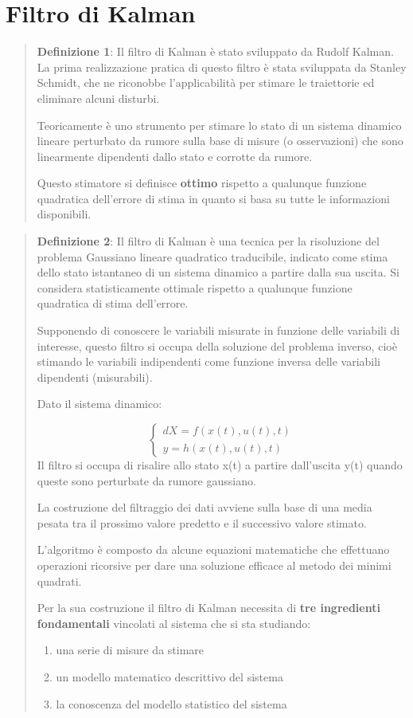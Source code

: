 \section{Filtro di Kalman}
\begin{quotation}
	\textbf{Definizione 1}: Il filtro di Kalman è stato sviluppato da Rudolf Kalman. 
	La prima realizzazione pratica di questo filtro è stata sviluppata da Stanley Schmidt, che ne riconobbe l'applicabilità per stimare le traiettorie ed eliminare alcuni disturbi.
	
	Teoricamente è uno strumento per stimare lo stato di un sistema dinamico lineare perturbato da rumore sulla base di misure (o osservazioni) che sono linearmente dipendenti dallo stato e corrotte da rumore.
	
	Questo stimatore si definisce \textbf{ottimo} rispetto a qualunque funzione quadratica dell’errore di stima in quanto si basa su tutte le informazioni disponibili.
\end{quotation}
\begin{quotation}
	\textbf{Definizione 2}:	Il filtro di Kalman è una tecnica per la risoluzione del problema Gaussiano lineare quadratico traducibile, indicato come stima dello stato istantaneo di un sistema dinamico a partire dalla sua uscita. Si considera statisticamente ottimale rispetto a qualunque funzione quadratica di stima dell'errore.
	
	Supponendo di conoscere le variabili misurate in funzione delle variabili di interesse, questo filtro si occupa della soluzione del problema inverso, cioè stimando le variabili indipendenti come funzione inversa delle variabili dipendenti (misurabili).
	
	Dato il sistema dinamico:
	
	\begin{equation}
	\begin{cases}
		dX = f ( x(t),u(t),t) \\
		y = h( x(t),u(t),t)
	\end{cases}
	\end{equation}
	Il filtro si occupa di risalire allo stato x(t) a partire dall'uscita y(t) quando queste sono perturbate da rumore gaussiano.
	
	La costruzione del filtraggio dei dati avviene sulla base di una media pesata tra il prossimo valore predetto e il successivo valore stimato.
	
	L'algoritmo è composto da alcune equazioni matematiche che effettuano operazioni ricorsive per dare una soluzione efficace al metodo dei minimi quadrati.
	
	Per la sua costruzione il filtro di Kalman necessita di \textbf{tre ingredienti	fondamentali} vincolati al sistema che si sta studiando:
	\begin{enumerate}
		\item una serie di misure da stimare
		\item un modello matematico descrittivo del sistema
		\item la conoscenza del	modello statistico del sistema
	\end{enumerate}
	
\end{quotation}	

 
 
